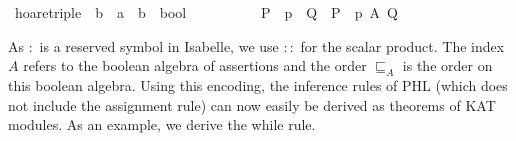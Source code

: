 \documentclass{llncs}
\begin{document}
\begin{isabellebody}
\isanewline
{}\isamarkupfalse%
\ hoare{}triple\ {}{}\ {}{}b\ {}\ {}a\ {}\ {}b\ {}\ bool{}\ {}{}{}\ {}\ {}\ {}\ {}{}\ {}{}{}{}{}{}{}{}{}{}\ {}{}{}\ \isanewline
\ \ {}P\ {}\ p\ {}\ Q\ {}\ P\ {}\ p\ {}\isactrlbsub A\isactrlesub \ Q{}\isanewline
\end{isabellebody}

As $:$ is a reserved symbol in Isabelle, we use $::$ for the scalar
product. The index $A$ refers to the boolean algebra of assertions and
the order $\sqsubseteq_A$ is the order on this boolean algebra. Using
this encoding, the inference rules of PHL (which does not include the
assignment rule) can now easily be derived as theorems of KAT
modules. As an example, we derive the while rule.
\end{document}
